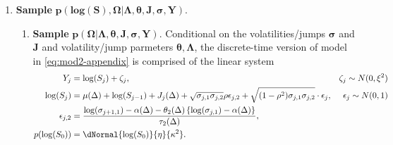 \begin{enumerate}
\item \textbf{Sample} $\boldsymbol{p(\mbox{log} (S), \Omega |\Lambda, \theta, J, \sigma, Y)}.$ 
  \begin{enumerate}
  \item \textbf{Sample} $\boldsymbol{p(\Omega| \Lambda, \theta, J, \sigma, Y)}.$ Conditional on the volatilities/jumps $\boldsymbol{\sigma}$ and $\boldsymbol{J}$ and volatility/jump parmeters $\boldsymbol{\theta}, \boldsymbol{\Lambda}$, the discrete-time version of model in \eqref{eq:mod2-appendix} is comprised of the linear system
    \begin{align}
      Y_j &= \log(S_j) + \zeta_j, & \zeta_j \sim N(0,\xi^2) \nonumber \\
      \log(S_{j}) &= \mu(\Delta) + \log(S_{j-1}) +  J_j(\Delta) + \sqrt{\sigma_{j,1}\sigma_{j,2}}\rho\epsilon_{j,2} +  \sqrt{(1-\rho^2) \sigma_{j,1}\sigma_{j,2}}\cdot\epsilon_{j}, & \epsilon_{j} \sim N(0,1) \label{eq:step1a} \\
      \epsilon_{j,2} &= \frac{\log(\sigma_{j+1,1}) - \alpha(\Delta) - \theta_2(\Delta)\left\{\log(\sigma_{j,1})-\alpha(\Delta)\right\}}{\tau_2(\Delta)}, \nonumber \\
      p(\log(S_0)) &= \dNormal{\log(S_0)}{\eta}{\kappa^2}. \nonumber
    \end{align}
    

\end{enumerate}
\end{enumerate}
